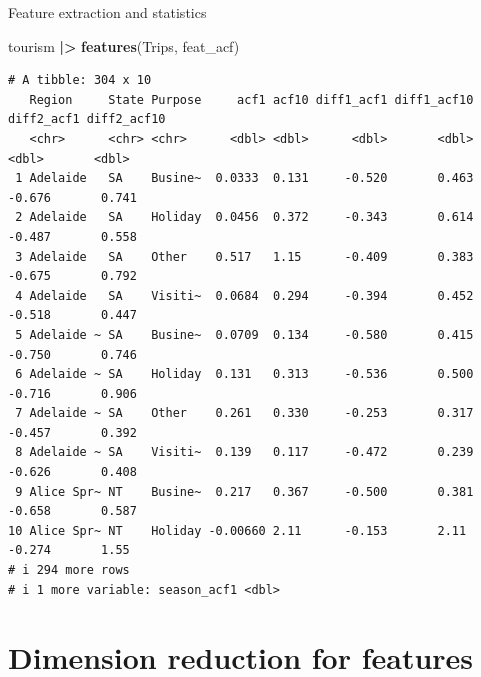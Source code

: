 \documentclass[
  14pt,
  ignorenonframetext,
  aspectratio=169,
]{beamer}
\newenvironment{Shaded}{\begin{snugshade}}{\end{snugshade}}
\newcommand{\FunctionTok}[1]{\textcolor[rgb]{0.13,0.29,0.53}{\textbf{#1}}}
\newcommand{\NormalTok}[1]{#1}
\newcommand{\SpecialCharTok}[1]{\textcolor[rgb]{0.81,0.36,0.00}{\textbf{#1}}}
\renewenvironment{Shaded}{\vspace*{0.15cm}\color{black}\fontsize{10}{10}\sf\begin{snugshade}\color{black}}{\end{snugshade}}
\begin{document}
\begin{frame}[fragile]{Feature extraction and statistics}
\protect{}\label{feature-extraction-and-statistics-4}
\fontsize{9}{10}\sf

\begin{Shaded}
\begin{Highlighting}[]
\NormalTok{tourism }\SpecialCharTok{|\textgreater{}} \FunctionTok{features}\NormalTok{(Trips, feat\_acf)}
\end{Highlighting}
\end{Shaded}

\begin{verbatim}
# A tibble: 304 x 10
   Region     State Purpose     acf1 acf10 diff1_acf1 diff1_acf10 diff2_acf1 diff2_acf10
   <chr>      <chr> <chr>      <dbl> <dbl>      <dbl>       <dbl>      <dbl>       <dbl>
 1 Adelaide   SA    Busine~  0.0333  0.131     -0.520       0.463     -0.676       0.741
 2 Adelaide   SA    Holiday  0.0456  0.372     -0.343       0.614     -0.487       0.558
 3 Adelaide   SA    Other    0.517   1.15      -0.409       0.383     -0.675       0.792
 4 Adelaide   SA    Visiti~  0.0684  0.294     -0.394       0.452     -0.518       0.447
 5 Adelaide ~ SA    Busine~  0.0709  0.134     -0.580       0.415     -0.750       0.746
 6 Adelaide ~ SA    Holiday  0.131   0.313     -0.536       0.500     -0.716       0.906
 7 Adelaide ~ SA    Other    0.261   0.330     -0.253       0.317     -0.457       0.392
 8 Adelaide ~ SA    Visiti~  0.139   0.117     -0.472       0.239     -0.626       0.408
 9 Alice Spr~ NT    Busine~  0.217   0.367     -0.500       0.381     -0.658       0.587
10 Alice Spr~ NT    Holiday -0.00660 2.11      -0.153       2.11      -0.274       1.55 
# i 294 more rows
# i 1 more variable: season_acf1 <dbl>
\end{verbatim}
\end{frame}

\section{Dimension reduction for
features}\label{dimension-reduction-for-features}
\end{document}
